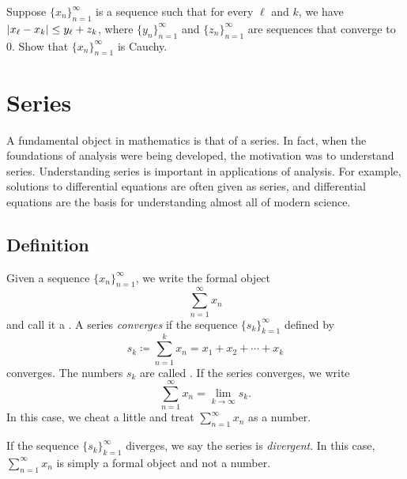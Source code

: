 \begin{exercise}
Suppose 
$\{ x_n \}_{n=1}^\infty$ is a sequence such that for every $\ell$ and $k$,
we have
$\lvert {x_\ell-x_k} \rvert \leq y_\ell + z_k$, where
$\{ y_n \}_{n=1}^\infty$ and 
$\{ z_n \}_{n=1}^\infty$ are sequences that converge to $0$.
Show that 
$\{ x_n \}_{n=1}^\infty$ is Cauchy.
\end{exercise}



\sectionnewpage
\section{Series}
\label{sec:series}



A fundamental object in mathematics is that of a series.  In fact, when
the foundations of analysis were being developed, the motivation was to
understand series.  Understanding series is important in applications
of analysis.  For example, solutions to differential equations are often
given as series, and differential equations are the basis for understanding
almost all of modern science.

\subsection{Definition}

\begin{defn}
Given a sequence $\{ x_n \}_{n=1}^\infty$, we write the formal object
\begin{equation*}
\sum_{n=1}^\infty x_n
\end{equation*}
and call it a \emph{}.  A series
\emph{converges} if the sequence
$\{ s_k \}_{k=1}^\infty$
defined by
\begin{equation*}
s_k \coloneqq \sum_{n=1}^k x_n = x_1 + x_2 + \cdots + x_k
\end{equation*}
converges.
The numbers $s_k$ are called
\emph{}.
If the series converges, we write
\begin{equation*}
\sum_{n=1}^\infty x_n =  \lim\limits_{k\to\infty} s_k .
\end{equation*}
In this case, we cheat a little and treat
$\sum_{n=1}^\infty x_n$ as a number.

If the sequence $\{ s_k \}_{k=1}^\infty$ diverges,
we say the series is \emph{divergent}.
In this case, $\sum_{n=1}^\infty x_n$ is simply a formal object and not a number.
\end{defn}

